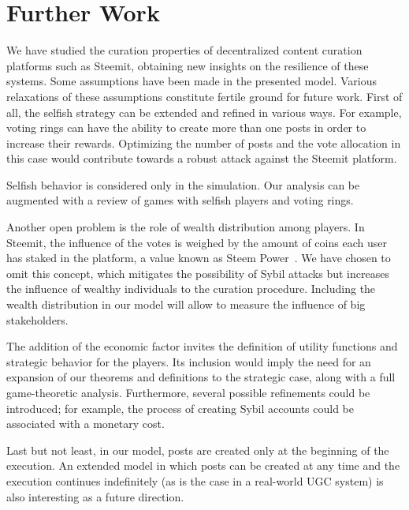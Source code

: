 \section{Further Work}

  We have studied the curation properties of decentralized content curation
  platforms such as Steemit, obtaining new insights on the resilience of these
  systems. Some assumptions have been made in the presented model. Various
  relaxations of these assumptions constitute fertile ground for future work.
  First of all, the selfish strategy can be extended and refined in various
  ways. For example, voting rings can have the ability to create more than one
  posts in order to increase their rewards. Optimizing the number of posts and
  the vote allocation in this case would contribute towards a robust attack
  against the Steemit platform.

  Selfish behavior is considered only in the simulation. Our analysis can be
  augmented with a review of games with selfish players and voting rings.

  Another open problem is the role of wealth distribution among players. In
  Steemit, the influence of the votes is weighed by the amount of coins each
  user has staked in the platform, a value known as Steem Power~\cite{steemit}.
  We have chosen to omit this concept, which mitigates the possibility of Sybil
  attacks but increases the influence of wealthy individuals to the curation
  procedure. Including the wealth distribution in our model will allow to measure  the influence of big stakeholders.

  The addition of the economic factor invites the definition of utility
  functions and strategic behavior for the players. Its inclusion would imply
  the need for an expansion of our theorems and definitions to the strategic
  case, along with a full game-theoretic analysis. Furthermore, several possible
  refinements could be introduced; for example, the process of creating Sybil
  accounts could be associated with a monetary cost.

  Last but not least, in our model, posts are created only at the beginning of
  the execution. An extended model in which posts can be created at any time and
  the execution continues indefinitely (as is the case in a real-world UGC system)
  is also interesting as a future direction.
